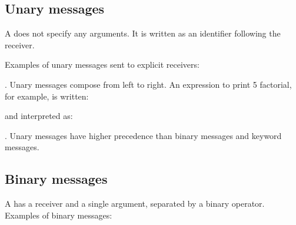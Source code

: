 \documentclass[letterpaper,10pt,english]{sphinxmanual}
\begin{document}

\subsection{Unary messages}
\label{\detokenize{langref:unary-messages}}\label{\detokenize{langref:index-44}}\label{\detokenize{langref:pp-unary-messages}}
A  does not specify any arguments. It is written as an identifier following the receiver.

Examples of unary messages sent to explicit receivers:

\begin{sphinxVerbatim}[commandchars=\\\{\}]
 
 
\end{sphinxVerbatim}

. Unary messages compose from left to right. An expression to print 5 factorial, for example, is written:

\begin{sphinxVerbatim}[commandchars=\\\{\}]
  
\end{sphinxVerbatim}

and interpreted as:

\begin{sphinxVerbatim}[commandchars=\\\{\}]
  
\end{sphinxVerbatim}

. Unary messages have higher precedence than binary messages and keyword messages.


\subsection{Binary messages}
\label{\detokenize{langref:index-47}}\label{\detokenize{langref:binary-messages}}\label{\detokenize{langref:pp-binary-messages}}
A  has a receiver and a single argument, separated by a binary operator. Examples of binary messages:
\end{document}
